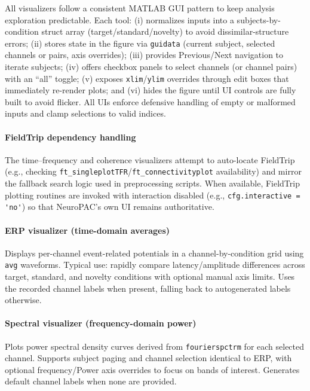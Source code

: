 \documentclass[12pt]{report}
\begin{document}
All visualizers follow a consistent MATLAB GUI pattern to keep analysis exploration predictable. Each tool: (i) normalizes inputs into a subjects-by-condition struct array (target/standard/novelty) to avoid dissimilar-structure errors; (ii) stores state in the figure via \verb|guidata| (current subject, selected channels or pairs, axis overrides); (iii) provides Previous/Next navigation to iterate subjects; (iv) offers checkbox panels to select channels (or channel pairs) with an “all” toggle; (v) exposes \verb|xlim|/\verb|ylim| overrides through edit boxes that immediately re-render plots; and (vi) hides the figure until UI controls are fully built to avoid flicker. All UIs enforce defensive handling of empty or malformed inputs and clamp selections to valid indices.

\paragraph{FieldTrip dependency handling}\mbox{}

The time–frequency and coherence visualizers attempt to auto-locate FieldTrip (e.g., checking \verb|ft_singleplotTFR|/\verb|ft_connectivityplot| availability) and mirror the fallback search logic used in preprocessing scripts. When available, FieldTrip plotting routines are invoked with interaction disabled (e.g., \verb|cfg.interactive = 'no'|) so that NeuroPAC’s own UI remains authoritative.

\paragraph{ERP visualizer (time-domain averages)}\mbox{}

Displays per-channel event-related potentials in a channel-by-condition grid using \verb|avg| waveforms. Typical use: rapidly compare latency/amplitude differences across target, standard, and novelty conditions with optional manual axis limits. Uses the recorded channel labels when present, falling back to autogenerated labels otherwise.

\paragraph{Spectral visualizer (frequency-domain power)}\mbox{}

Plots power spectral density curves derived from \verb|fourierspctrm| for each selected channel. Supports subject paging and channel selection identical to ERP, with optional frequency/Power axis overrides to focus on bands of interest. Generates default channel labels when none are provided.
\end{document}
